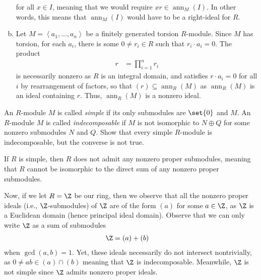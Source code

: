 \documentclass[10pt]{mypackage}
\begin{document}
\begin{solution}
\begin{enumerate}[(a)]
      for all $x\in I$, meaning that we would require $xr\in \operatorname{ann}_M(I)$. In other words, this means that $\operatorname{ann}_M(I)$ would have to be a right-ideal for $R$.
    \item Let $M = \left\langle a_1,\dots,a_n \right\rangle$ be a finitely generated torsion $R$-module. Since $M$ has torsion, for each $a_i$, there is some $0\neq r_i\in R$ such that $r_i\cdot a_i = 0$. The product
      \begin{align*}
        r &= \prod_{i=1}^{n}r_i
      \end{align*}
      is necessarily nonzero as $R$ is an integral domain, and satisfies $r\cdot a_i = 0$ for all $i$ by rearrangement of factors, so that $\left( r \right)\subseteq \operatorname{ann}_{R}\left( M \right)$ as $\operatorname{ann}_R\left( M \right)$ is an ideal containing $r$. Thus, $\operatorname{ann}_R\left( M \right)$ is a nonzero ideal.
  \end{enumerate}
\end{solution}
\begin{problem}[Problem 4]
  An $R$-module $M$ is called \textit{simple} if its only submodules are $\set{0}$ and $M$. An $R$-module $M$ is called \textit{indecomposable} if $M$ is not isomorphic to $N\oplus Q$ for some nonzero submodules $N$ and $Q$. Show that every simple $R$-module is indecomposable, but the converse is not true.
\end{problem}
\begin{solution}
  If $R$ is simple, then $R$ does not admit any nonzero proper submodules, meaning that $R$ cannot be isomorphic to the direct sum of any nonzero proper submodules.\newline

  Now, if we let $R = \Z$ be our ring, then we observe that all the nonzero proper ideals (i.e., $\Z$-submodules) of $\Z$ are of the form $\left( a \right)$ for some $a\in \Z$, as $\Z$ is a Euclidean domain (hence principal ideal domain). Observe that we can only write $\Z$ as a sum of submodules
  \begin{align*}
    \Z &= \left( a \right) + \left( b \right)
  \end{align*}
  when $\operatorname{gcd}\left( a,b \right) = 1$. Yet, these ideals necessarily do not intersect nontrivially, as $0\neq ab\in \left( a \right)\cap\left( b \right)$ meaning that $\Z$ is indecomposable. Meanwhile, $\Z$ is not simple since $\Z$ admits nonzero proper ideals.
\end{solution}
\end{document}
